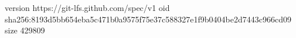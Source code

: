 version https://git-lfs.github.com/spec/v1
oid sha256:8193d5bb654eba5c471b0a9575f75e37c588327e1f9b0404be2d7443c966cd09
size 429809
